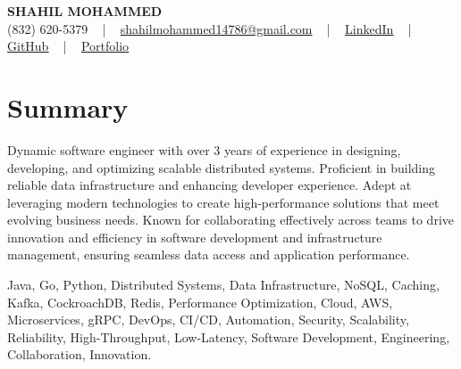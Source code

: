 \documentclass[letterpaper,10pt]{article}
\begin{document}
\begin{center}
    {\fontsize{14pt}{12pt}\selectfont \textbf{\MakeUppercase{Shahil Mohammed}}}\\ \vspace{2pt}
    \fontsize{10pt}{12pt}\selectfont (832) 620-5379 ~ | ~ \href{mailto:shahilmohammed14786@gmail.com}{shahilmohammed14786@gmail.com} ~ | ~  
    \href{https://www.linkedin.com/in/shahil-mohammed-9652931a1/}{\color{blue}\underline{LinkedIn}}  ~ | ~ 
    \href{https://github.com/freakbeast14}{\color{blue}\underline{GitHub}} ~ | ~ 
    \href{https://shahil-mohammed.netlify.app/}{\color{blue}\underline{Portfolio}}
    \vspace{-8pt}
\end{center}

\section{Summary}
\vspace{-2pt}\fontsize{8pt}{9pt}\selectfont
Dynamic software engineer with over 3 years of experience in designing, developing, and optimizing scalable distributed systems. Proficient in building reliable data infrastructure and enhancing developer experience. Adept at leveraging modern technologies to create high-performance solutions that meet evolving business needs. Known for collaborating effectively across teams to drive innovation and efficiency in software development and infrastructure management, ensuring seamless data access and application performance.
 \vspace{-5pt}
 
{\fontsize{1pt}{1pt}\selectfont\color{white}
Java, Go, Python, Distributed Systems, Data Infrastructure, NoSQL, Caching, Kafka, CockroachDB, Redis, Performance Optimization, Cloud, AWS, Microservices, gRPC, DevOps, CI/CD, Automation, Security, Scalability, Reliability, High-Throughput, Low-Latency, Software Development, Engineering, Collaboration, Innovation.
}
\vspace{-8pt}

\vspace{-2pt}
\end{document}

